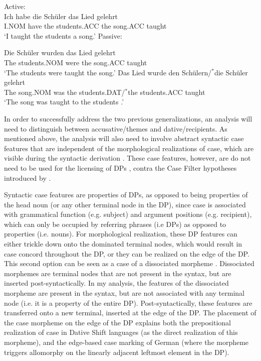 \begin{exe}
\ex Active:\\
\gll Ich habe die Schüler das Lied gelehrt\\
I.NOM have the students.ACC the song.ACC taught\\
\trans `I taught the students a song.'
\ex Passive:
\begin{xlist}
\ex \gll Die Schüler wurden das Lied gelehrt\\
The students.NOM were the song.ACC taught\\
\trans `The students were taught the song.'
\ex \gll Das Lied wurde den Schülern/$^{*}$die Schüler gelehrt\\
The song.NOM was the students.DAT/$^{*}$the students.ACC taught\\
\trans `The song was taught to the students \citep[ex. 20]{Alexiadou.2013b}.'
\end{xlist}
\end{exe}

In order to successfully address the two previous generalizations, an analysis will need to distinguish between accusative/themes and dative/recipients. As mentioned above, the analysis will also need to involve abstract syntactic case features that are independent of the morphological realizations of case, which are visible during the syntactic derivation \citep{Vergnaud.1977,Legate.2008}. These case features, however, are do not need to be used for the licensing of DPs \citep{Marantz.2000,McFadden.2004}, contra the Case Filter hypotheses introduced by \cite{Vergnaud.1977}.

Syntactic case features are properties of DPs, as opposed to being properties of the head noun (or any other terminal node in the DP), since case is associated with grammatical function (e.g. subject) and argument positions (e.g. recipient), which can only be occupied by referring phrases (i.e DPs) as opposed to properties (i.e. nouns). For morphological realization, these DP features can either trickle down onto the dominated terminal nodes, which would result in case concord throughout the DP, or they can be realized on the edge of the DP. This second option can be seen as a case of a dissociated morpheme \citep{Embick.1997}. Dissociated morphemes are terminal nodes that are not present in the syntax, but are inserted post-syntactically. In my analysis, the features of the dissociated morpheme are present in the syntax, but are not associated with any terminal node (i.e. it is a property of the entire DP). Post-syntactically, these features are transferred onto a new terminal, inserted at the edge of the DP. The placement of the case morpheme on the edge of the DP explains both the prepositional realization of case in Dative Shift languages (as the direct realization of this morpheme), and the edge-based case marking of German (where the morpheme triggers allomorphy on the linearly adjacent leftmost element in the DP).

